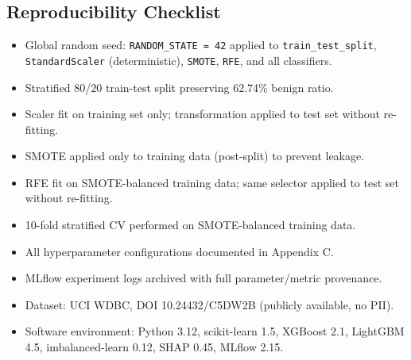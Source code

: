 \documentclass[10pt,letterpaper]{article}
\begin{document}
\subsection{Reproducibility Checklist}

\begin{itemize}
    \item[$\checkmark$] Global random seed: \texttt{RANDOM\_STATE = 42} applied to
    \texttt{train\_test\_split}, \texttt{StandardScaler} (deterministic), \texttt{SMOTE},
    \texttt{RFE}, and all classifiers.
    \item[$\checkmark$] Stratified 80/20 train-test split preserving 62.74\% benign ratio.
    \item[$\checkmark$] Scaler fit on training set only; transformation applied to test set
    without re-fitting.
    \item[$\checkmark$] SMOTE applied only to training data (post-split) to prevent leakage.
    \item[$\checkmark$] RFE fit on SMOTE-balanced training data; same selector applied to test
    set without re-fitting.
    \item[$\checkmark$] 10-fold stratified CV performed on SMOTE-balanced training data.
    \item[$\checkmark$] All hyperparameter configurations documented in Appendix C.
    \item[$\checkmark$] MLflow experiment logs archived with full parameter/metric provenance.
    \item[$\checkmark$] Dataset: UCI WDBC, DOI 10.24432/C5DW2B (publicly available, no PII).
    \item[$\checkmark$] Software environment: Python 3.12, scikit-learn 1.5, XGBoost 2.1,
    LightGBM 4.5, imbalanced-learn 0.12, SHAP 0.45, MLflow 2.15.
\end{itemize}
\end{document}
